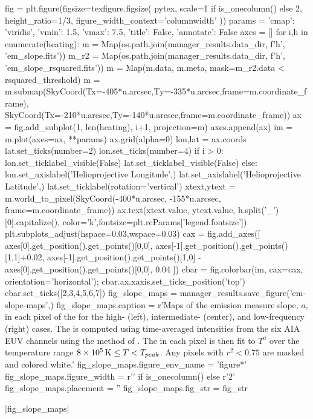 \begin{pycode}
fig = plt.figure(figsize=texfigure.figsize(
    pytex,
    scale=1 if is_onecolumn() else 2,
    height_ratio=1/3,
    figure_width_context='columnwidth'
))
params = {'cmap': 'viridis', 'vmin': 1.5, 'vmax': 7.5, 'title': False, 'annotate': False}
axes = []
for i,h in enumerate(heating):
    m = Map(os.path.join(manager_results.data_dir, f'{h}', 'em_slope.fits'))
    m_r2 = Map(os.path.join(manager_results.data_dir, f'{h}', 'em_slope_rsquared.fits'))
    m = Map(m.data, m.meta, mask=m_r2.data < rsquared_threshold)
    m = m.submap(SkyCoord(Tx=-405*u.arcsec,Ty=-335*u.arcsec,frame=m.coordinate_frame),
                 SkyCoord(Tx=-210*u.arcsec,Ty=-140*u.arcsec,frame=m.coordinate_frame))
    ax = fig.add_subplot(1, len(heating), i+1, projection=m)
    axes.append(ax)
    im = m.plot(axes=ax, **params)
    ax.grid(alpha=0)
    lon,lat = ax.coords
    lat.set_ticks(number=2)
    lon.set_ticks(number=4)
    if i > 0:
        lon.set_ticklabel_visible(False)
        lat.set_ticklabel_visible(False)
    else:
        lon.set_axislabel('Helioprojective Longitude',)
        lat.set_axislabel('Helioprojective Latitude',)
        lat.set_ticklabel(rotation='vertical')
    xtext,ytext = m.world_to_pixel(SkyCoord(-400*u.arcsec, -155*u.arcsec, frame=m.coordinate_frame))
    ax.text(xtext.value, ytext.value, h.split('_')[0].capitalize(),
            color='k',fontsize=plt.rcParams['legend.fontsize'])
plt.subplots_adjust(hspace=0.03,wspace=0.03)
cax = fig.add_axes([
    axes[0].get_position().get_points()[0,0],
    axes[-1].get_position().get_points()[1,1]+0.02,
    axes[-1].get_position().get_points()[1,0] - axes[0].get_position().get_points()[0,0],
    0.04
])
cbar = fig.colorbar(im, cax=cax, orientation='horizontal');
cbar.ax.xaxis.set_ticks_position('top')
cbar.set_ticks([2,3,4,5,6,7])
fig_slope_maps = manager_results.save_figure('em-slope-maps',)
fig_slope_maps.caption = r'Maps of the emission measure slope, $a$, in each pixel of the \AR{} for the high- (left), intermediate- (center), and low-frequency (right) cases. The \dem{} is computed using time-averaged intensities from the six AIA EUV channels using the method of \citet{hannah_differential_2012}. The \dem{} in each pixel is then fit to $T^a$ over the temperature range $8\times10^{5}\,\textup{K}\le T< T_{peak}$. Any pixels with $r^2<0.75$ are masked and colored white.'
fig_slope_maps.figure_env_name = 'figure*'
fig_slope_maps.figure_width = r'\columnwidth' if is_onecolumn() else r'2\columnwidth'
fig_slope_maps.placement = ''
fig_slope_maps.fig_str = fig_str
\end{pycode}
|fig_slope_maps|

